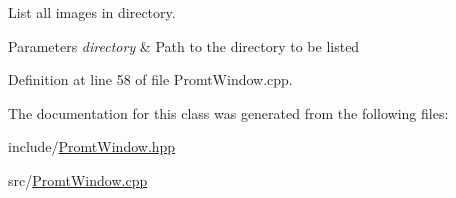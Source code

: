 List all images in directory. 


\begin{DoxyParams}{Parameters}
{\em directory} & Path to the directory to be listed \\
\hline
\end{DoxyParams}


Definition at line 58 of file Promt\+Window.\+cpp.



The documentation for this class was generated from the following files\+:\begin{DoxyCompactItemize}
\item 
include/\mbox{\hyperlink{PromtWindow_8hpp}{Promt\+Window.\+hpp}}\item 
src/\mbox{\hyperlink{PromtWindow_8cpp}{Promt\+Window.\+cpp}}\end{DoxyCompactItemize}
